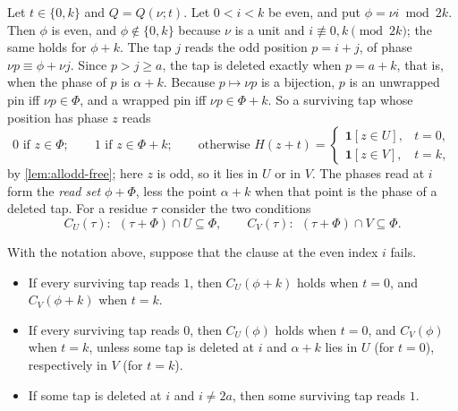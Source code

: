 Let $t\in\{0,k\}$ and $Q=Q(\nu;t)$. Let $0<i<k$ be even, and put
$\phi=\nu i\bmod2k$.
Then $\phi$ is even, and $\phi\notin\{0,k\}$ because $\nu$ is a unit and
$i\not\equiv0,k\pmod{2k}$; the same holds for $\phi+k$. The tap $j$ reads the
odd position $p=i+j$, of phase $\nu p\equiv\phi+\nu j$. Since $p>j\ge a$, the tap is
deleted exactly when $p=a+k$, that is, when the phase of $p$ is $\alpha+k$.
Because $p\mapsto \nu p$ is a bijection, $p$ is an unwrapped pin iff $\nu p\in \Phi$,
and a wrapped pin iff $\nu p\in \Phi+k$. So a surviving tap whose position has
phase $z$ reads
\begin{equation}
0 \text{ if } z\in \Phi;\qquad 1 \text{ if } z\in \Phi+k;\qquad
\text{otherwise } H(z+t)=\begin{cases}\mathbf 1[z\in U],&t=0,\\
\mathbf 1[z\in V],&t=k,\end{cases}
\label{eq:allodd-evenread}
\end{equation}
by \autoref{lem:allodd-free}; here $z$ is odd, so it lies in $U$ or in $V$.
The phases read at $i$ form the \emph{read set} $\phi+\Phi$, less the point
$\alpha+k$ when that point is the phase of a deleted tap. For a residue $\tau$
consider the two conditions
\[
C_U(\tau):\ \ (\tau+\Phi)\cap U\subseteq \Phi,\qquad
C_V(\tau):\ \ (\tau+\Phi)\cap V\subseteq \Phi.
\]

\begin{lemma}
\label{lem:allodd-windows}
With the notation above, suppose that the clause at the even index $i$ fails.
\begin{itemize}
\item[(i)] If every surviving tap reads $1$, then $C_U(\phi+k)$ holds when
$t=0$, and $C_V(\phi+k)$ when $t=k$.
\item[(ii)] If every surviving tap reads $0$, then $C_U(\phi)$ holds when
$t=0$, and $C_V(\phi)$ when $t=k$, unless some tap is deleted at $i$ and
$\alpha+k$ lies in $U$ (for $t=0$), respectively in $V$ (for $t=k$).
\item[(iii)] If some tap is deleted at $i$ and $i\ne2a$, then some surviving
tap reads $1$.
\end{itemize}
\end{lemma}

